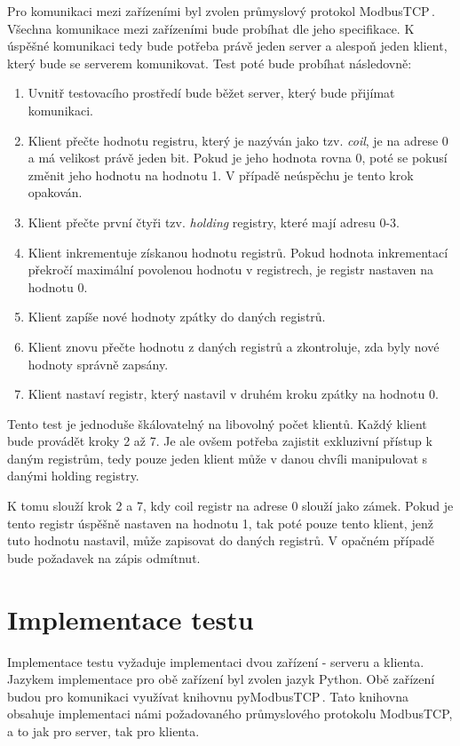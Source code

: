 Pro komunikaci mezi zařízeními byl zvolen průmyslový protokol ModbusTCP\,\cite{modbus}. Všechna komunikace mezi zařízeními bude probíhat dle jeho specifikace. K úspěšné komunikaci tedy bude potřeba právě jeden server a alespoň jeden klient, který bude se serverem komunikovat. Test poté bude probíhat následovně:

\begin{enumerate}
    \item Uvnitř testovacího prostředí bude běžet server, který bude přijímat komunikaci.
    \item Klient přečte hodnotu registru, který je nazýván jako tzv. \textit{coil}, je na adrese 0 a má velikost právě jeden bit. Pokud je jeho hodnota rovna 0, poté se pokusí změnit jeho hodnotu na hodnotu 1. V případě neúspěchu je tento krok opakován.
    \item Klient přečte první čtyři tzv. \textit{holding} registry, které mají adresu 0-3. 
    \item Klient inkrementuje získanou hodnotu registrů. Pokud hodnota inkrementací překročí maximální povolenou hodnotu v registrech, je registr nastaven na hodnotu 0.
    \item Klient zapíše nové hodnoty zpátky do daných registrů.
    \item Klient znovu přečte hodnotu z daných registrů a zkontroluje, zda byly nové hodnoty správně zapsány.
    \item Klient nastaví registr, který nastavil v druhém kroku zpátky na hodnotu 0.
\end{enumerate}

Tento test je jednoduše škálovatelný na libovolný počet klientů. Každý klient bude provádět kroky 2 až 7. Je ale ovšem potřeba zajistit exkluzivní přístup k daným registrům, tedy pouze jeden klient může v danou chvíli manipulovat s danými holding registry. 

K tomu slouží krok 2 a 7, kdy coil registr na adrese 0 slouží jako zámek. Pokud je tento registr úspěšně nastaven na hodnotu 1, tak poté pouze tento klient, jenž tuto hodnotu nastavil, může zapisovat do daných registrů. V opačném případě bude požadavek na zápis odmítnut.

\section{Implementace testu}\label{sec:python_test_impl}

Implementace testu vyžaduje implementaci dvou zařízení - serveru a klienta. Jazykem implementace pro obě zařízení byl zvolen jazyk Python. Obě zařízení budou pro komunikaci využívat knihovnu pyModbusTCP\,\cite{pymodbustcp}. Tato knihovna obsahuje implementaci námi požadovaného průmyslového protokolu ModbusTCP, a to jak pro server, tak pro klienta.
 
